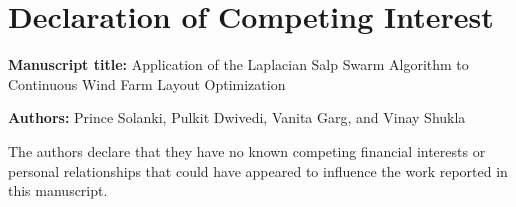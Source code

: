 \documentclass[11pt]{article}
\begin{document}
\section*{Declaration of Competing Interest}
\textbf{Manuscript title:} Application of the Laplacian Salp Swarm Algorithm to Continuous Wind Farm Layout Optimization

\medskip
\textbf{Authors:} Prince Solanki, Pulkit Dwivedi, Vanita Garg, and Vinay Shukla

\medskip
The authors declare that they have no known competing financial interests or personal relationships that could have appeared to influence the work reported in this manuscript.
\end{document}
